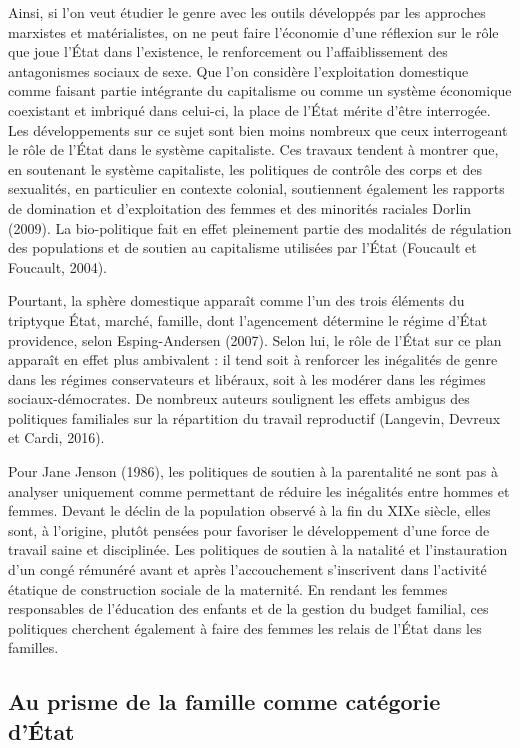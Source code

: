 \documentclass[
  12pt,
]{book}
\begin{document}
Ainsi, si l'on veut étudier le genre avec les outils développés par les
approches marxistes et matérialistes, on ne peut faire l'économie d'une
réflexion sur le rôle que joue l'État dans l'existence, le renforcement
ou l'affaiblissement des antagonismes sociaux de sexe. Que l'on
considère l'exploitation domestique comme faisant partie intégrante du
capitalisme ou comme un système économique coexistant et imbriqué dans
celui-ci, la place de l'État mérite d'être interrogée. Les
développements sur ce sujet sont bien moins nombreux que ceux
interrogeant le rôle de l'État dans le système capitaliste. Ces travaux
tendent à montrer que, en soutenant le système capitaliste, les
politiques de contrôle des corps et des sexualités, en particulier en
contexte colonial, soutiennent également les rapports de domination et
d'exploitation des femmes et des minorités raciales Dorlin (2009). La
bio-politique fait en effet pleinement partie des modalités de
régulation des populations et de soutien au capitalisme utilisées par
l'État (Foucault et Foucault, 2004).

Pourtant, la sphère domestique apparaît comme l'un des trois éléments du
triptyque État, marché, famille, dont l'agencement détermine le régime
d'État providence, selon Esping-Andersen (2007). Selon lui, le rôle de
l'État sur ce plan apparaît en effet plus ambivalent : il tend soit à
renforcer les inégalités de genre dans les régimes conservateurs et
libéraux, soit à les modérer dans les régimes sociaux-démocrates. De
nombreux auteurs soulignent les effets ambigus des politiques familiales
sur la répartition du travail reproductif (Langevin, Devreux et Cardi,
2016).

Pour Jane Jenson (1986), les politiques de soutien à la parentalité ne
sont pas à analyser uniquement comme permettant de réduire les
inégalités entre hommes et femmes. Devant le déclin de la population
observé à la fin du XIXe siècle, elles sont, à l'origine, plutôt pensées
pour favoriser le développement d'une force de travail saine et
disciplinée. Les politiques de soutien à la natalité et l'instauration
d'un congé rémunéré avant et après l'accouchement s'inscrivent dans
l'activité étatique de construction sociale de la maternité. En rendant
les femmes responsables de l'éducation des enfants et de la gestion du
budget familial, ces politiques cherchent également à faire des femmes
les relais de l'État dans les familles.

\subsection{Au prisme de la famille comme catégorie
d'État}\label{au-prisme-de-la-famille-comme-catuxe9gorie-duxe9tat}
\end{document}
